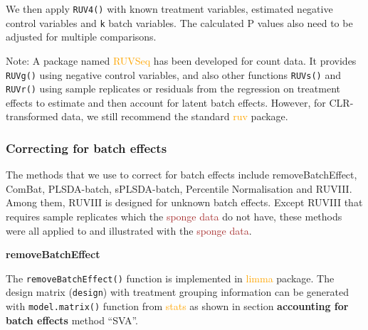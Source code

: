 \documentclass[
]{book}
\newenvironment{Shaded}{\begin{snugshade}}{\end{snugshade}}
\newcommand{\AttributeTok}[1]{\textcolor[rgb]{0.77,0.63,0.00}{#1}}
\newcommand{\FunctionTok}[1]{\textcolor[rgb]{0.00,0.00,0.00}{#1}}
\newcommand{\NormalTok}[1]{#1}
\newcommand{\OtherTok}[1]{\textcolor[rgb]{0.56,0.35,0.01}{#1}}
\newcommand{\SpecialCharTok}[1]{\textcolor[rgb]{0.00,0.00,0.00}{#1}}
\newcommand{\StringTok}[1]{\textcolor[rgb]{0.31,0.60,0.02}{#1}}
\begin{document}
We then apply \texttt{RUV4()} with known treatment variables, estimated negative control variables and \texttt{k} batch variables. The calculated P values also need to be adjusted for multiple comparisons.

\begin{Shaded}
\end{Shaded}

Note: A package named \textcolor{orange}{RUVSeq} has been developed for count data. It provides \texttt{RUVg()} using negative control variables, and also other functions \texttt{RUVs()} and \texttt{RUVr()} using sample replicates \citep{moskovicz2020skin} or residuals from the regression on treatment effects to estimate and then account for latent batch effects. However, for CLR-transformed data, we still recommend the standard \textcolor{orange}{ruv} package.

\hypertarget{correcting-for-batch-effects}{%
\subsubsection{Correcting for batch effects}\label{correcting-for-batch-effects}}

The methods that we use to correct for batch effects include removeBatchEffect, ComBat, PLSDA-batch, sPLSDA-batch, Percentile Normalisation and RUVIII. Among them, RUVIII is designed for unknown batch effects. Except RUVIII that requires sample replicates which the \textcolor{brown}{sponge data} do not have, these methods were all applied to and illustrated with the \textcolor{brown}{sponge data}.

\textbf{removeBatchEffect}

The \texttt{removeBatchEffect()} function is implemented in \textcolor{orange}{limma} package. The design matrix (\texttt{design}) with treatment grouping information can be generated with \texttt{model.matrix()} function from \textcolor{orange}{stats} as shown in section \textbf{accounting for batch effects} method ``SVA''.
\end{document}
